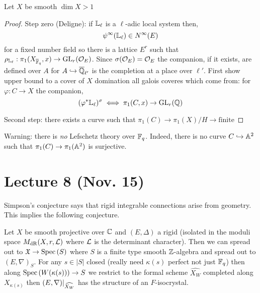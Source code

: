 \documentclass[12pt]{article}
\begin{document}
\begin{theorem}[Drinfeld]
Let $X$ be smooth $\dim{X} > 1$
\end{theorem}

\begin{proof}
Step zero (Deligne): if $\mathbb{L}_{\ell}$ is a $\ell$-adic local system then,
\[ \psi^{\infty}(\mathbb{L}_{\ell}) \in N^{\infty}(E) \]
for a fixed number field so there is a lattice $E^r$ such that $\rho_{\mathbb{L}_\ell} : \pi_1(X_{\overline{\mathbb{F}}_q}, x) \to \mathrm{GL}_r(\mathcal{O}_{E})$. Since $\sigma(\mathcal{O}_{E}) = \mathcal{O}_{E}$ the companion, if it exists, are defined over $A$ for $A \hookrightarrow \overline{\mathbb{Q}}_{\ell'}$ is the completion at a place over $\ell'$. 
First show upper bound to a cover of $X$ domination all galois coveres which come from: for $\varphi : C \to X$ the companion,
\[ (\varphi^* \mathbb{L}_{\ell})^{\sigma} \iff \pi_1(C, x) \to \mathrm{GL}_r(\mathbb{Q}) \]


Second step: there exists a curve such that $\pi_1(C) \to \pi_1(X) / H \to \text{finite}$

\end{proof}


\begin{rmk}
Warning: there is \textit{no} Lefschetz theory over $\mathbb{F}_q$. Indeed, there is no curve $C \hookrightarrow \mathbb{A}^2$ such that $\pi_1(C) \to \pi_1(\mathbb{A}^2)$ is surjective.
\end{rmk}

\section{Lecture 8 (Nov. 15)}

\begin{rmk}
Simpson's conjecture says that rigid integrable connections arise from geometry. This implies the following conjecture.
\end{rmk}

\begin{theorem}[E. Grocdenz, 2018]
Let $X$ be smooth projective over $\mathbb{C}$ and $(E, \Delta)$ a rigid (isolated in the moduli space $M_{\mathrm{dR}}(X, r, \mathcal{L})$ where $\mathcal{L}$ is the determinant character). Then we can spread out to $\mathfrak{X} \to \mathrm{Spec}\left( S \right)$ where $S$ is a finite type smooth $\mathbb{Z}$-algebra and spread out to $(E, \nabla)_S$. For any $s \in |S|$ closed (really need $\kappa(s)$ perfect not just $\mathbb{F}_q$) then along $\mathrm{Spec}\left( W(\kappa(s)) \right) \to S$ we restrict to the formal scheme $\widehat{X_W}$ completed along $X_{\kappa(s)}$ then $(E, \nabla)|_{\widehat{X_W}}$ has the structure of an $F$-isocrystal.
\end{theorem}
\end{document}

